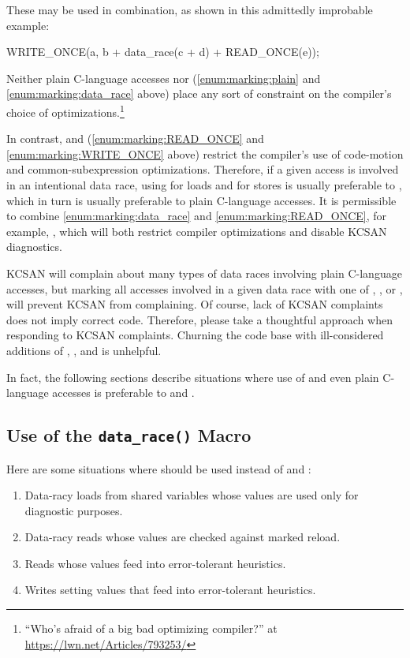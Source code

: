 These may be used in combination, as shown in this admittedly improbable
example:

\begin{VerbatimU}
	WRITE_ONCE(a, b + data_race(c + d) + READ_ONCE(e));
\end{VerbatimU}

Neither plain C-language accesses nor 
(\ref{enum:marking:plain} and \ref{enum:marking:data_race} above) place
any sort of constraint on the compiler's choice of optimizations.\footnote{
``Who's afraid of a big bad optimizing compiler?'' at
\url{https://lwn.net/Articles/793253/}
}

In contrast,  and 
(\ref{enum:marking:READ_ONCE} and \ref{enum:marking:WRITE_ONCE}
above) restrict the
compiler's use of code-motion and common-subexpression optimizations.
Therefore, if a given access is involved in an intentional data race,
using  for loads and  for stores is usually
preferable to , which in turn is usually preferable to plain
C-language accesses.
It is permissible to combine
\ref{enum:marking:data_race} and \ref{enum:marking:READ_ONCE}, for example,
, which will both restrict compiler optimizations
and disable KCSAN diagnostics.

KCSAN will complain about many types of data races involving plain
C-language accesses, but marking all accesses involved in a given data
race with one of , , or ,
will prevent KCSAN from complaining.
Of course, lack of KCSAN complaints does not imply correct code.
Therefore, please take a thoughtful approach when responding to KCSAN
complaints.
Churning the code base with ill-considered additions of ,
, and  is unhelpful.

In fact, the following sections describe situations where use of
 and even plain C-language accesses is preferable to
 and .


\subsection{Use of the \texttt{data\_race()} Macro}

Here are some situations where  should be used instead of
 and :

\begin{enumerate}
\item	Data-racy loads from shared variables whose values are used only
	for diagnostic purposes.

\item	Data-racy reads whose values are checked against marked reload.

\item	Reads whose values feed into error-tolerant heuristics.

\item	Writes setting values that feed into error-tolerant heuristics.
\end{enumerate}

